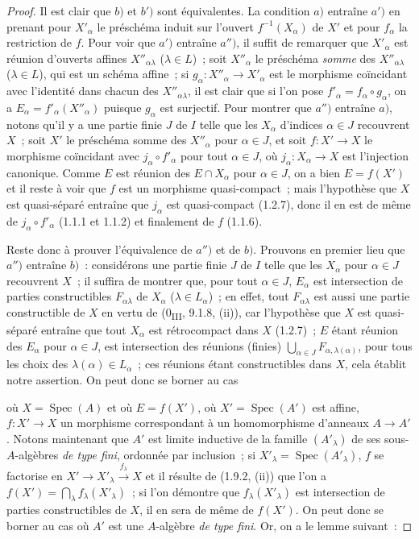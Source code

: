 \begin{proof}
Il est clair que $b)$ et $b')$ sont équivalentes. La condition $a)$ entraîne
$a')$ en prenant pour $X'_\alpha$ le préschéma induit sur l'ouvert
$f^{-1}(X_\alpha)$ de $X'$ et pour $f_\alpha$ la restriction de $f$. Pour
voir que $a')$ entraîne $a'')$, il suffit de remarquer que $X'_\alpha$ est
réunion d'ouverts affines $X''_{\alpha\lambda}$ ($\lambda\in L$)~; soit
$X''_\alpha$ le préschéma \emph{somme} des $X''_{\alpha\lambda}$
($\lambda\in L$), qui est un schéma affine~; si
$g_\alpha:X''_\alpha\to X'_\alpha$ est le morphisme coïncidant avec
l'identité dans chacun des $X''_{\alpha\lambda}$, il est clair que si l'on
pose $f'_\alpha=f_\alpha\circ g_\alpha$, on a
$E_\alpha=f'_\alpha(X''_\alpha)$ puisque $g_\alpha$ est surjectif. Pour
montrer que $a'')$ entraîne $a)$, notons qu'il y a une partie finie $J$ de
$I$ telle que les $X_\alpha$ d'indices $\alpha\in J$ recouvrent $X$~; soit
$X'$ le préschéma somme des $X''_\alpha$ pour $\alpha\in J$, et soit
$f:X'\to X$ le morphisme coïncidant avec $j_\alpha\circ f'_\alpha$ pour tout
$\alpha\in J$, où $j_\alpha:X_\alpha\to X$ est l'injection canonique. Comme
$E$ est réunion des $E\cap X_\alpha$ pour $\alpha\in J$, on a bien
$E=f(X')$ et il reste à voir que $f$ est un morphisme quasi-compact~; mais
l'hypothèse que $X$ est quasi-séparé entraîne que $j_\alpha$ est
quasi-compact (1.2.7), donc il en est de même de
$j_\alpha\circ f'_\alpha$ (1.1.1 et 1.1.2) et finalement de $f$ (1.1.6).

Reste donc à prouver l'équivalence de $a'')$ et de $b)$. Prouvons en premier
lieu que $a'')$ entraîne $b)$~: considérons une partie finie $J$ de $I$ telle
que les $X_\alpha$ pour $\alpha\in J$ recouvrent $X$~; il suffira de montrer
que, pour tout $\alpha\in J$, $E_\alpha$ est intersection de parties
constructibles $F_{\alpha\lambda}$ de $X_\alpha$ ($\lambda\in L_\alpha$)~;
en effet, tout $F_{\alpha\lambda}$ est aussi une partie constructible de $X$
en vertu de (0\textsubscript{III}, 9.1.8, (ii)), car l'hypothèse que $X$ est
quasi-séparé entraîne que tout $X_\alpha$ est rétrocompact dans $X$ (1.2.7)~;
$E$ étant réunion des $E_\alpha$ pour $\alpha\in J$, est intersection des
réunions (finies) $\bigcup_{\alpha\in J}F_{\alpha,\lambda(\alpha)}$, pour
tous les choix des $\lambda(\alpha)\in L_\alpha$~; ces réunions étant
constructibles dans $X$, cela établit notre assertion. On peut donc se borner
au cas


où $X=\operatorname{Spec}(A)$ et où $E=f(X')$, où
$X'=\operatorname{Spec}(A')$ est affine, $f:X'\to X$ un morphisme
correspondant à un homomorphisme d'anneaux $A\to A'$. Notons maintenant que
$A'$ est limite inductive de la famille $(A'_\lambda)$ de ses
sous-$A$-algèbres \emph{de type fini}, ordonnée par inclusion~; si
$X'_\lambda=\operatorname{Spec}(A'_\lambda)$, $f$ se factorise en
$X'\to X'_\lambda\xrightarrow{f_\lambda}X$ et il résulte de (1.9.2, (ii))
que l'on a $f(X')=\bigcap_\lambda f_\lambda(X'_\lambda)$~; si l'on démontre
que $f_\lambda(X'_\lambda)$ est intersection de parties constructibles de
$X$, il en sera de même de $f(X')$. On peut donc se borner au cas où $A'$ est
une $A$-algèbre \emph{de type fini}. Or, on a le lemme suivant~:
\end{proof}

